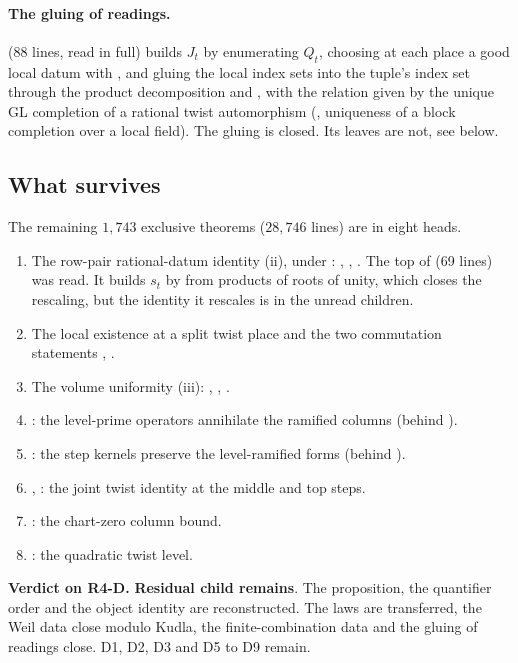 \documentclass[11pt]{article}
\newcommand{\sR}{\textbf{Residual child remains}}
\theoremstyle{remark}
\begin{document}
\paragraph{The gluing of readings.}  (88 lines, read in full) builds $J_t$ by enumerating $Q_t$, choosing at each place a good local datum with , and gluing the local index sets into the tuple's index set through the product decomposition  and , with the relation given by the unique GL completion of a rational twist automorphism (, uniqueness of a block completion over a local field). The gluing is closed. Its leaves are not, see below.

\subsection{What survives}

The remaining $1{,}743$ exclusive theorems ($28{,}746$ lines) are in eight heads.
\begin{enumerate}[nosep,label=D\arabic*.]
\item The row-pair rational-datum identity (ii), under : , , . The top of  (69 lines) was read. It builds $s_t$ by  from products of roots of unity, which closes the rescaling, but the identity it rescales is in the unread children.
\item The local existence  at a split twist place and the two commutation statements , .
\item The volume uniformity (iii): , , .
\setcounter{enumi}{4}
\item {}: the level-prime operators annihilate the ramified columns (behind ).
\item {}: the step kernels preserve the level-ramified forms (behind ).
\item {}, : the joint twist identity at the middle and top steps.
\item {}: the chart-zero column bound.
\item {}: the quadratic twist level.
\end{enumerate}
\textbf{Verdict on R4-D.} \sR. The proposition, the quantifier order and the object identity are reconstructed. The laws are transferred, the Weil data close modulo Kudla, the finite-combination data and the gluing of readings close. D1, D2, D3 and D5 to D9 remain.
\end{document}
